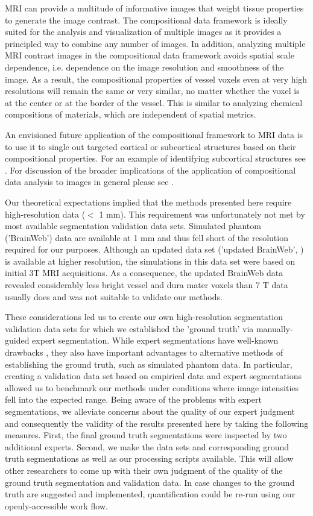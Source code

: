 MRI can provide a multitude of informative images that weight tissue properties to generate the image contrast. The compositional data framework is ideally suited for the analysis and visualization of multiple images as it provides a principled way to combine any number of images. In addition, analyzing multiple MRI contrast images in the compositional data framework avoids spatial scale dependence, i.e. dependence on the image resolution and smoothness of the image. As a result, the compositional properties of vessel voxels even at very high resolutions will remain the same or very similar, no matter whether the voxel is at the center or at the border of the vessel. This is similar to analyzing chemical compositions of materials, which are independent of spatial metrics.

An envisioned future application of the compositional framework to MRI data is to use it to single out targeted cortical or subcortical structures based on their compositional properties. For an example of identifying subcortical structures see . For discussion of the broader implications of the application of compositional data analysis to images in general please see \cite{2017arXiv170503457F}.

Our theoretical expectations implied that the methods presented here require high-resolution data ($<$ 1 mm). This requirement was unfortunately not met by most available segmentation validation data sets. Simulated phantom ('BrainWeb') data \cite{Collins1998} are available at 1 mm and thus fell short of the resolution required for our purposes. Although an updated data set ('updated BrainWeb', \cite{Aubert-Broche2006a,Aubert-Broche2006b}) is available at higher resolution, the simulations in this data set were based on initial 3T MRI acquisitions. As a consequence, the updated BrainWeb data revealed considerably less bright vessel and dura mater voxels than 7 T data usually does and was not suitable to validate our methods.

These considerations led us to create our own high-resolution segmentation validation data sets for which we established the 'ground truth' via manually-guided expert segmentation. While expert segmentations have well-known drawbacks \cite{Despotovic2015, Valverde2015}, they also have important advantages to alternative methods of establishing the ground truth, such as simulated phantom data. In particular, creating a validation data set based on empirical data and expert segmentations allowed us to benchmark our methods under conditions where image intensities fell into the expected range. Being aware of the problems with expert segmentations, we alleviate concerns about the quality of our expert judgment and consequently the validity of the results presented here by taking the following measures. First, the final ground truth segmentations were inspected by two additional experts. Second, we make the data sets and corresponding ground truth segmentations as well as our processing scripts available. This will allow other researchers to come up with their own judgment of the quality of the ground truth segmentation and validation data. In case changes to the ground truth are suggested and implemented, quantification could be re-run using our openly-accessible work flow. 

